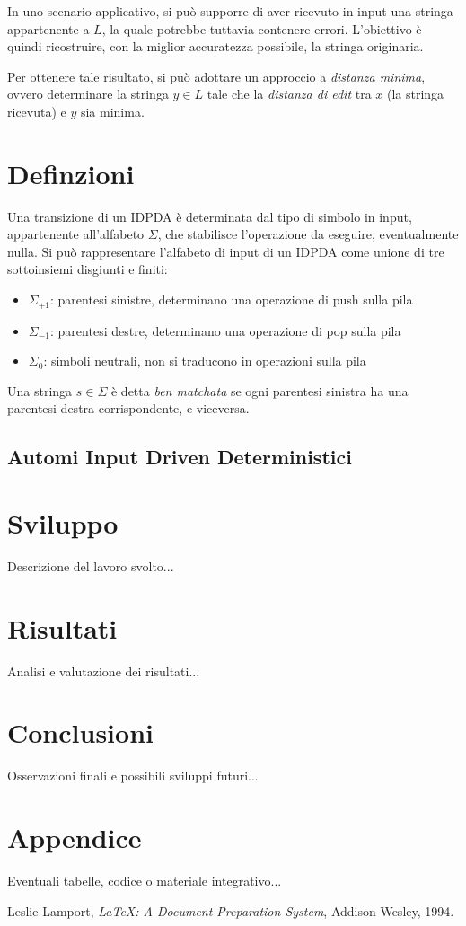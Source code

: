 \documentclass[a4paper,12pt]{report}
\begin{document}
In uno scenario applicativo, si può supporre di aver ricevuto in input una stringa appartenente a $L$, la quale potrebbe tuttavia contenere errori. L'obiettivo è quindi ricostruire, con la miglior accuratezza possibile, la stringa originaria.


Per ottenere tale risultato, si può adottare un approccio a \emph{distanza minima}, ovvero determinare la stringa $y \in L$ tale che la \textit{distanza di edit} tra $x$ (la stringa ricevuta) e $y$ sia minima.


\chapter{Definzioni}
Una transizione di un IDPDA è determinata dal tipo di simbolo in input, appartenente all'alfabeto $\Sigma$, che stabilisce l'operazione da eseguire, eventualmente nulla.
Si può rappresentare l'alfabeto di input di un IDPDA come unione di tre sottoinsiemi disgiunti e finiti:


\begin{itemize}
  \item $\Sigma_{+1}$: parentesi sinistre, determinano una operazione di push sulla pila
  \item $\Sigma_{-1}$: parentesi destre, determinano una operazione di pop sulla pila
  \item $\Sigma_{0}$: simboli neutrali, non si traducono in operazioni sulla pila
\end{itemize}


Una stringa $s \in \Sigma$ è detta \textit{ben matchata} se ogni parentesi sinistra ha una parentesi destra corrispondente, e viceversa.

\section{Automi Input Driven Deterministici}



\chapter{Sviluppo}
Descrizione del lavoro svolto...


\chapter{Risultati}
Analisi e valutazione dei risultati...


\chapter{Conclusioni}
Osservazioni finali e possibili sviluppi futuri...


\appendix
\chapter{Appendice}
Eventuali tabelle, codice o materiale integrativo...


\clearpage
\begin{thebibliography}{9}


  Leslie Lamport,
  \textit{LaTeX: A Document Preparation System},
  Addison Wesley, 1994.




\end{thebibliography}
\end{document}
